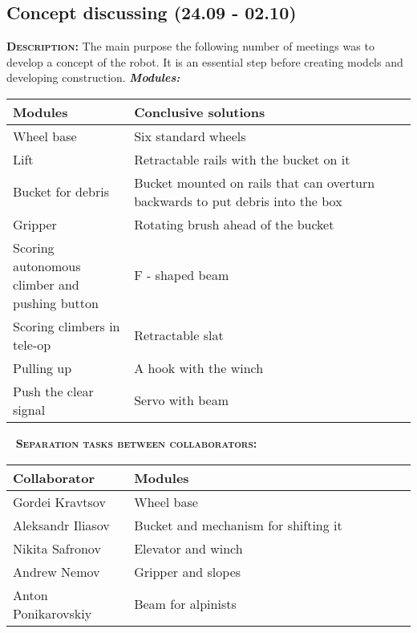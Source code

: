 \subsection{Concept discussing (24.09 - 02.10)}
	\textsc{\textbf{Description:}} The main purpose the following number of meetings was to develop a concept of the robot. It is an essential step before creating models and developing construction.\newline \newline
	\textit{\textbf{Modules:}}
	
	\begin{table}[H]
		\vspace{-2mm}
		\begin{center}
			\begin{tabular}{|p{0.3\linewidth}|p{0.7\linewidth}|}
				\hline
				Modules & Conclusive solutions \\
				\hline
				Wheel base & Six standard wheels \\
				\hline
				Lift & Retractable rails with the bucket on it \\
				\hline
				Bucket for debris & Bucket mounted on rails that can overturn backwards to put debris into the box \\
				\hline
				Gripper & Rotating brush ahead of the bucket \\
				\hline
				Scoring autonomous climber and pushing button & F - shaped beam \\
				\hline
				Scoring climbers in tele-op & Retractable slat \\
				\hline
				Pulling up & A hook with the winch \\
				\hline
				Push the clear signal & Servo with beam \\
				\hline
			\end{tabular}
		\end{center}
	\end{table}
	\vspace{-10mm}
	 \newline
	\textsc{\textbf{Separation tasks between collaborators:}}
	
	\begin{table}[H]
		\vspace{-2mm}
		\begin{center}
			\begin{tabular}{|p{0.3\linewidth}|p{0.7\linewidth}|}
				\hline
				Collaborator & Modules \\
				\hline
				Gordei Kravtsov & Wheel base \\
				\hline
				Aleksandr Iliasov & Bucket and mechanism for shifting it \\
				\hline
				Nikita Safronov & Elevator and winch \\
				\hline
				Andrew Nemov & Gripper and slopes \\
				\hline
				Anton Ponikarovskiy & Beam for alpinists \\
				\hline
			\end{tabular}
		\end{center}
	\end{table}
  
